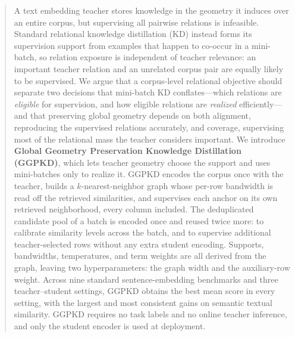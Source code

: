 \begin{abstract}
A text embedding teacher stores knowledge in the geometry it induces over an
entire corpus, but supervising all pairwise relations is infeasible. Standard
relational knowledge distillation (KD) instead forms its supervision support
from examples that happen to co-occur in a mini-batch, so relation exposure is
independent of teacher relevance: an important teacher relation and an
unrelated corpus pair are equally likely to be supervised. We argue that a
corpus-level relational objective should separate two decisions that mini-batch
KD conflates---which relations are \emph{eligible} for supervision, and how
eligible relations are \emph{realized} efficiently---and that preserving global
geometry depends on both alignment, reproducing the supervised relations
accurately, and coverage, supervising most of the relational mass the teacher
considers important. We introduce \textbf{Global Geometry Preservation
Knowledge Distillation (GGPKD)}, which lets teacher geometry choose the support
and uses mini-batches only to realize it. GGPKD encodes the corpus once with
the teacher, builds a $k$-nearest-neighbor graph whose per-row bandwidth is
read off the retrieved similarities, and supervises each anchor on its own
retrieved neighborhood, every column included. The deduplicated candidate pool of a batch is encoded
once and reused twice more: to calibrate similarity levels across the batch,
and to supervise additional teacher-selected rows without any extra student
encoding. Supports, bandwidths, temperatures, and term weights are all derived
from the graph, leaving two hyperparameters: the graph width and the
auxiliary-row weight. Across nine standard sentence-embedding benchmarks and
three teacher--student settings, GGPKD obtains the best mean score in every
setting, with the largest and most consistent gains on semantic textual
similarity. GGPKD requires no task labels and no online teacher inference, and
only the student encoder is used at deployment.
\end{abstract}
